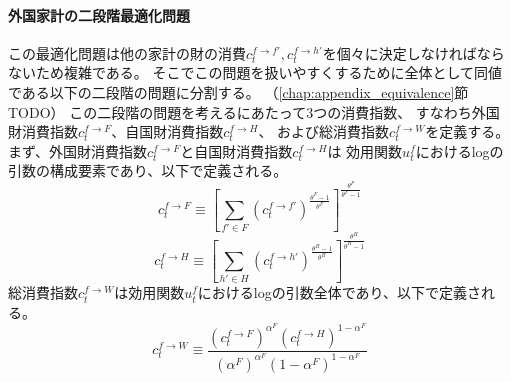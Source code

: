 \paragraph{外国家計の二段階最適化問題}
\label{sec:chapter3_households_problem_setup_foreign_two_stage}
この最適化問題は他の家計の財の消費\(c_t^{f\to f'},c_t^{f\to h'}\)を個々に決定しなければならないため複雑である。
そこでこの問題を扱いやすくするために全体として同値である以下の二段階の問題に分割する。
（\ref{chap:appendix_equivalence}節TODO）
この二段階の問題を考えるにあたって3つの消費指数、
すなわち外国財消費指数\(c_t^{f\to F}\)、自国財消費指数\(c_t^{f\to H}\)、
および総消費指数\(c_t^{f\to W}\)を定義する。
まず、外国財消費指数\(c_t^{f\to F}\)と自国財消費指数\(c_t^{f\to H}\)は
効用関数\(u_t^f\)におけるlogの引数の構成要素であり、以下で定義される。
\begin{equation}
\label{form:chapter3_households_problem_setup_foreign_c_f_F_def}
    c_t^{f\to F}\equiv\left[\sum_{f'\in F}(c_t^{f\to f'})^{\frac{\theta^F-1}{\theta^F}}\right]^{\frac{\theta^F}{\theta^F-1}}
\end{equation}
\begin{equation}
\label{form:chapter3_households_problem_setup_foreign_c_f_H_def}
    c_t^{f\to H}\equiv\left[\sum_{h'\in H}(c_t^{f\to h'})^{\frac{\theta^H-1}{\theta^H}}\right]^{\frac{\theta^H}{\theta^H-1}}
\end{equation}
総消費指数\(c_t^{f\to W}\)は効用関数\(u_t^f\)におけるlogの引数全体であり、以下で定義される。
\begin{equation}
\label{form:chapter3_households_problem_setup_foreign_c_f_W_def}
    c_t^{f\to W}\equiv\frac{(c_t^{f\to F})^{\alpha^F}(c_t^{f\to H})^{1-\alpha^F}}{(\alpha^F)^{\alpha^F}(1-\alpha^F)^{1-\alpha^F}}
\end{equation}
